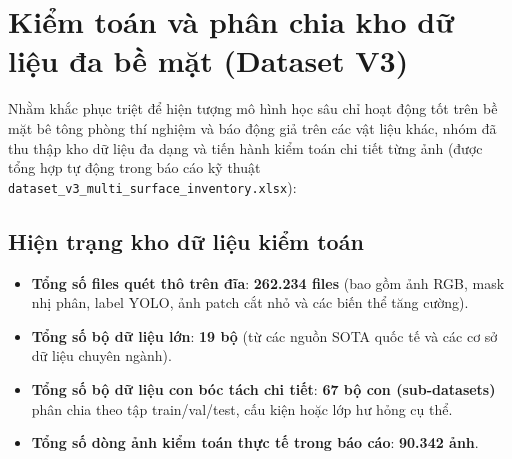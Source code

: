\documentclass[12pt,a4paper]{article}
\begin{document}
\section{Kiểm toán và phân chia kho dữ liệu đa bề mặt (Dataset V3)}
Nhằm khắc phục triệt để hiện tượng mô hình học sâu chỉ hoạt động tốt trên bề mặt bê tông phòng thí nghiệm và báo động giả trên các vật liệu khác, nhóm đã thu thập kho dữ liệu đa dạng và tiến hành kiểm toán chi tiết từng ảnh (được tổng hợp tự động trong báo cáo kỹ thuật \texttt{dataset\_v3\_multi\_surface\_inventory.xlsx}):

\subsection{Hiện trạng kho dữ liệu kiểm toán}
\begin{itemize}[leftmargin=*]
    \item \textbf{Tổng số files quét thô trên đĩa}: \textbf{262.234 files} (bao gồm ảnh RGB, mask nhị phân, label YOLO, ảnh patch cắt nhỏ và các biến thể tăng cường).
    \item \textbf{Tổng số bộ dữ liệu lớn}: \textbf{19 bộ} (từ các nguồn SOTA quốc tế và các cơ sở dữ liệu chuyên ngành).
    \item \textbf{Tổng số bộ dữ liệu con bóc tách chi tiết}: \textbf{67 bộ con (sub-datasets)} phân chia theo tập train/val/test, cấu kiện hoặc lớp hư hỏng cụ thể.
    \item \textbf{Tổng số dòng ảnh kiểm toán thực tế trong báo cáo}: \textbf{90.342 ảnh}.
\end{itemize}
\end{document}
